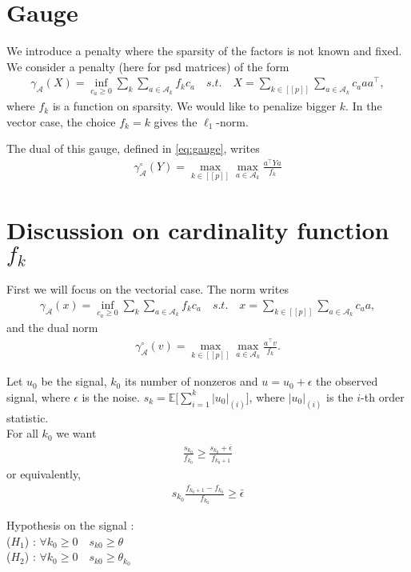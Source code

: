 \documentclass{article}
\def\A{\mathcal{A}}
\def\ga{\gamma_\mathcal{A}}
\def\goa{\gamma^{\circ}_{\A}}
\newcommand\itgset[1]{[\!\![#1]\!\!]}
\def\EE{\mathbb{E}}
\begin{document}
\section{Gauge}
We introduce a penalty where the sparsity of the factors is not known and fixed. We consider a penalty (here for psd matrices) of the form
\begin{align}
\label{eq:gauge}
\ga(X)=\inf_{c_a\geq 0} \sum_{k}\sum_{a\in\A_{k}}f_k c_a \quad s.t.\quad X=\sum_{k\in\itgset{p}}\sum_{a\in\A_{k}}c_a aa^{\top},
\end{align}
where $f_k$ is a function on sparsity. We would like to penalize bigger $k$. In the vector case, the choice $f_k=k$ gives the $\ell_1$-norm.

The dual of this gauge, defined in \ref{eq:gauge}, writes
\begin{align}
\label{eq:dualgauge}
\goa(Y)=\max_{k\in\itgset{p}}\max_{a\in\A_{k}} \frac{a^{\top}Ya}{f_k}
\end{align}

\section{Discussion on cardinality function $f_k$}
First we will focus on the vectorial case. The norm writes
\begin{align}
\label{eq:gaugevec}
\ga(x)=\inf_{c_a\geq 0} \sum_{k}\sum_{a\in\A_{k}}f_k c_a \quad s.t.\quad x=\sum_{k\in\itgset{p}}\sum_{a\in\A_{k}}c_a a,
\end{align}
and the dual norm
\begin{align}
\label{eq:dualgauge}
\goa(v)=\max_{k\in\itgset{p}}\max_{a\in\A_{k}} \frac{a^{\top}v}{f_k}.
\end{align}

Let $u_0$ be the signal, $k_0$ its number of nonzeros and $u=u_0+\epsilon$ the observed signal, where $\epsilon$ is the noise. $s_k=\EE\big[\sum_{i=1}^{k}|u_0|_{(i)}\big]$, where $|u_0|_{(i)}$ is the $i$-th order statistic.\\

For all $k_0$ we want 
\begin{align}
\label{eq:cond1}
\frac{s_{k_0}}{f_{k_0}}\geq \frac{s_{k_0} + \bar{\epsilon}}{f_{k_0+1}}
\end{align}
or equivalently,
\begin{align}
\label{eq:cond1bis}
s_{k_0}\frac{f_{k_0+1}-f_{k_0}}{f_{k_0}}\geq  \bar{\epsilon}
\end{align}

Hypothesis on the signal :\\
($H_1$) : $\forall k_0\geq 0 \quad s_{k0}\geq \theta$\\
($H_2$) : $\forall k_0\geq 0 \quad s_{k0}\geq \theta_{k_0}$\\
\end{document}
